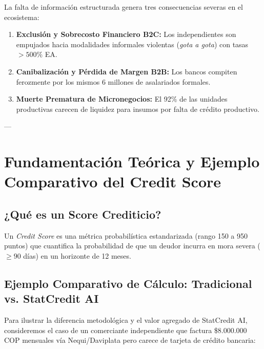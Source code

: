 \documentclass[11pt,a4paper]{article}
\begin{document}
\begin{tcolorbox}[colback=white,colframe=alertRed,title=Consecuencias del Problema Raíz (Efectos de Segundo Orden)]
La falta de información estructurada genera tres consecuencias severas en el ecosistema:
\begin{enumerate}
    \item \textbf{Exclusión y Sobrecosto Financiero B2C:} Los independientes son empujados hacia modalidades informales violentas (\textit{gota a gota}) con tasas $>500\%$ EA.
    \item \textbf{Canibalización y Pérdida de Margen B2B:} Los bancos compiten ferozmente por los mismos 6 millones de asalariados formales.
    \item \textbf{Muerte Prematura de Micronegocios:} El 92\% de las unidades productivas carecen de liquidez para insumos por falta de crédito productivo.
\end{enumerate}
\end{tcolorbox}

---

\section{Fundamentación Teórica y Ejemplo Comparativo del Credit Score}

\subsection{¿Qué es un Score Crediticio?}
Un \textit{Credit Score} es una métrica probabilística estandarizada (rango 150 a 950 puntos) que cuantifica la probabilidad de que un deudor incurra en mora severa ($\ge 90$ días) en un horizonte de 12 meses.

\subsection{Ejemplo Comparativo de Cálculo: Tradicional vs. StatCredit AI}
Para ilustrar la diferencia metodológica y el valor agregado de StatCredit AI, consideremos el caso de un comerciante independiente que factura \$8.000.000 COP mensuales vía Nequi/Daviplata pero carece de tarjeta de crédito bancaria:
\end{document}
